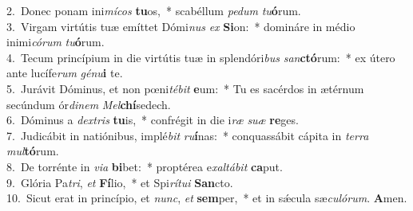 {2.~}Donec ponam ini\textit{mí}\textit{cos} \textbf{tu}os,~* scabéllum \textit{pe}\textit{dum} \textit{tu}\textbf{ó}rum.\\
{3.~}Virgam virtútis tuæ emíttet Dómi\textit{nus} \textit{ex} \textbf{Si}on:~* domináre in médio inimi\textit{có}\textit{rum} \textit{tu}\textbf{ó}rum.\\
{4.~}Tecum princípium in die virtútis tuæ in splendóri\textit{bus} \textit{san}\textbf{ctó}rum:~* ex útero ante lucífe\textit{rum} \textit{gé}\textit{nu}\textbf{i} te.\\
{5.~}Jurávit Dóminus, et non pœni\textit{té}\textit{bit} \textbf{e}um:~* Tu es sacérdos in ætérnum secúndum ór\textit{di}\textit{nem} \textit{Mel}\textbf{chí}sedech.\\
{6.~}Dóminus a \textit{dex}\textit{tris} \textbf{tu}is,~* confrégit in die i\textit{ræ} \textit{su}\textit{æ} \textbf{re}ges.\\
{7.~}Judicábit in natiónibus, implé\textit{bit} \textit{ru}\textbf{í}nas:~* conquassábit cápita in \textit{ter}\textit{ra} \textit{mul}\textbf{tó}rum.\\
{8.~}De torrénte in \textit{vi}\textit{a} \textbf{bi}bet:~* proptérea e\textit{xal}\textit{tá}\textit{bit} \textbf{ca}put.\\
{9.~}Glória Pa\textit{tri}, \textit{et} \textbf{Fí}lio,~* et Spi\textit{rí}\textit{tu}\textit{i} \textbf{San}cto.\\
{10.~}Sicut erat in princípio, et \textit{nunc}, \textit{et} \textbf{sem}per,~* et in sǽcula sæ\textit{cu}\textit{ló}\textit{rum}. \textbf{A}men.\\
